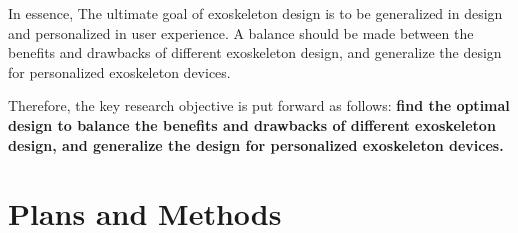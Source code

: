 \documentclass{article}
\begin{document}
In essence, The ultimate goal of exoskeleton design is to be generalized in design and personalized in user experience. A balance should be made between the benefits and drawbacks of different exoskeleton design, and generalize the design for personalized exoskeleton devices.

Therefore, the key research objective is put forward as follows: \textbf{find the optimal design to balance the benefits and drawbacks of different exoskeleton design, and generalize the design for personalized exoskeleton devices.}

\section{Plans and Methods}

    
    

    
\end{document}

